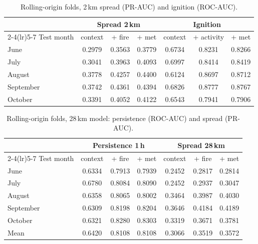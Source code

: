 \documentclass[11pt,a4paper,oneside]{report}
\begin{document}
\begin{table}[H]
\centering\small
\caption{Rolling-origin folds, 2\,km spread (PR-AUC) and ignition (ROC-AUC).}
\begin{tabular}{lcccccc}
\toprule
 & \multicolumn{3}{c}{Spread 2\,km} & \multicolumn{3}{c}{Ignition} \\
\cmidrule(lr){2-4}\cmidrule(lr){5-7}
Test month & context & + fire & + met & context & + activity & + met \\
\midrule
June      & 0.2979 & 0.3563 & 0.3779 & 0.6734 & 0.8231 & 0.8266 \\
July      & 0.3041 & 0.3963 & 0.4093 & 0.6997 & 0.8414 & 0.8419 \\
August    & 0.3778 & 0.4257 & 0.4400 & 0.6124 & 0.8697 & 0.8712 \\
September & 0.3742 & 0.4361 & 0.4394 & 0.6826 & 0.8777 & 0.8767 \\
October   & 0.3391 & 0.4052 & 0.4122 & 0.6543 & 0.7941 & 0.7906 \\
\bottomrule
\end{tabular}
\end{table}

\begin{table}[H]
\centering\small
\caption{Rolling-origin folds, 28\,km model: persistence (ROC-AUC) and spread (PR-AUC).}
\begin{tabular}{lcccccc}
\toprule
 & \multicolumn{3}{c}{Persistence 1\,h} & \multicolumn{3}{c}{Spread 28\,km} \\
\cmidrule(lr){2-4}\cmidrule(lr){5-7}
Test month & context & + fire & + met & context & + fire & + met \\
\midrule
June      & 0.6334 & 0.7913 & 0.7939 & 0.2452 & 0.2817 & 0.2814 \\
July      & 0.6780 & 0.8084 & 0.8090 & 0.2452 & 0.2937 & 0.3047 \\
August    & 0.6358 & 0.8065 & 0.8002 & 0.3464 & 0.3987 & 0.4030 \\
September & 0.6309 & 0.8198 & 0.8204 & 0.3646 & 0.4184 & 0.4189 \\
October   & 0.6321 & 0.8280 & 0.8303 & 0.3319 & 0.3671 & 0.3781 \\
\midrule
Mean      & 0.6420 & 0.8108 & 0.8108 & 0.3066 & 0.3519 & 0.3572 \\
\bottomrule
\end{tabular}
\end{table}
\end{document}
